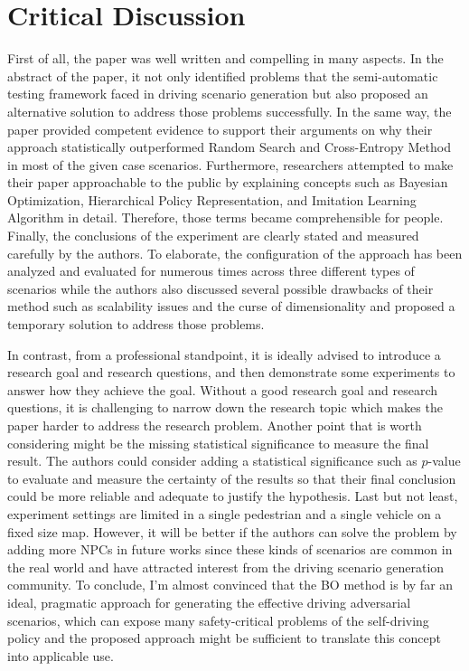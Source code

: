 \documentclass[10pt,a4paper]{report}
\begin{document}
\section{Critical Discussion}
First of all, the paper was well written and compelling in many aspects. In the abstract of the paper, it not only identified problems that the semi-automatic testing framework faced in driving scenario generation but also proposed an alternative solution to address those problems successfully. 
%
In the same way, the paper provided competent evidence to support their arguments on why their approach statistically outperformed Random Search and Cross-Entropy Method in most of the given case scenarios.
%
Furthermore, researchers attempted to make their paper approachable to the public by explaining concepts such as Bayesian Optimization, Hierarchical Policy Representation, and Imitation Learning Algorithm in detail.
%
Therefore, those terms became comprehensible for people.  
%
Finally, the conclusions of the experiment are clearly stated and measured carefully by the authors. 
%
To elaborate, the configuration of the approach has been analyzed and evaluated for numerous times across three different types of scenarios while the authors also discussed several possible drawbacks of their method such as scalability issues and the curse of dimensionality and proposed a temporary solution to address those problems.
%

In contrast, from a professional standpoint, it is ideally advised to introduce a research goal and research questions, and then demonstrate some experiments to answer how they achieve the goal. 
%
Without a good research goal and research questions, it is challenging to narrow down the research topic which makes the paper harder to address the research problem.
%
Another point that is worth considering might be the missing statistical significance to measure the final result.
%
The authors could consider adding a statistical significance such as $p$-value to evaluate and measure the certainty of the results so that their final conclusion could be more reliable and adequate to justify the hypothesis.
%
Last but not least, experiment settings are limited in a single pedestrian and a single vehicle on a fixed size map. 
%
However, it will be better if the authors can solve the problem by adding more NPCs in future works since these kinds of scenarios are common in the real world and have attracted interest from the driving scenario generation community.
%
To conclude, I’m almost convinced that the BO method is by far an ideal, pragmatic approach for generating the effective driving adversarial scenarios, which can expose many safety-critical problems of the self-driving policy and the proposed approach might be sufficient to translate this concept into applicable use.
\end{document}
